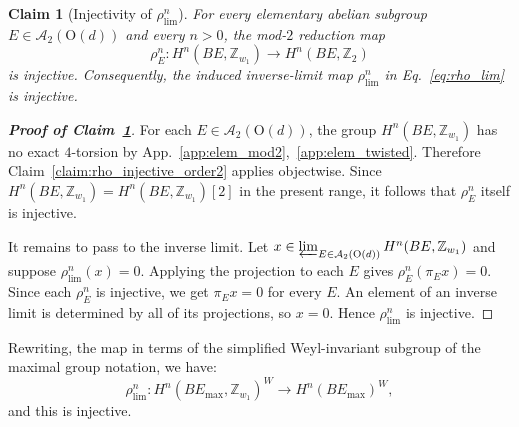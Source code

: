 \documentclass[aps,prx,reprint,superscriptaddress,twocolumn,amsmath,amssymb,amsfonts, nofootinbib]{revtex4-2}
\newcommand{\Z}{\mathbb{Z}}
\theoremstyle{apsstyle}
\newtheorem{claim}{Claim}
\begin{document}
\medskip 

\begin{claim}[Injectivity of $\rho^{n}_{\lim}$]
\label{claim:rho_lim_injective}
For every elementary abelian subgroup $E\in\mathcal A_2(\mathrm{O}(d))$ and every $n>0$, the mod-$2$ reduction map
\begin{equation}
\rho^{n}_E:
H^n(BE,\Z_{w_1}) \longrightarrow H^n(BE,\Z_2)
\end{equation}
is injective. Consequently, the induced inverse-limit map $\rho^{n}_{\lim}$ in Eq.~\eqref{eq:rho_lim} is injective.
\end{claim}

\begin{proof}[\textnormal{\textbf{Proof of Claim~\ref{claim:rho_lim_injective}}}]
For each $E\in\mathcal A_2(\mathrm{O}(d))$, the group $H^n(BE,\Z_{w_1})$ has no exact $4$-torsion by App.~\ref{app:elem_mod2},~\ref{app:elem_twisted}. Therefore Claim~\ref{claim:rho_injective_order2} applies objectwise. Since $H^n(BE,\Z_{w_1})=H^n(BE,\Z_{w_1})[2]$ in the present range, it follows that $\rho^{n}_E$ itself is injective.

\bigskip 

\noindent It remains to pass to the inverse limit. Let
$x\in \varprojlim_{E\in\mathcal A_2(\mathrm{O}(d))}H^n(BE,\Z_{w_1})$
and suppose $\rho^{n}_{\lim}(x)=0$. Applying the projection to each $E$ gives $\rho^{n}_E(\pi_E x)=0$. Since each $\rho^{n}_E$ is injective, we get $\pi_E x=0$ for every $E$. An element of an inverse limit is determined by all of its projections, so $x=0$. Hence $\rho^{n}_{\lim}$ is injective.
\end{proof}

\bigskip 

\noindent Rewriting, the map in terms of the simplified Weyl-invariant subgroup of the maximal group notation, we have: $$\rho^{n}_{\lim}: H^{n}(BE_{\mathrm{max}}, \mathbb{Z}_{w_{1}})^{W} \to H^{n}(BE_{\mathrm{max}})^{W},$$ 
and this is injective. 

\bigskip 
\end{document}
